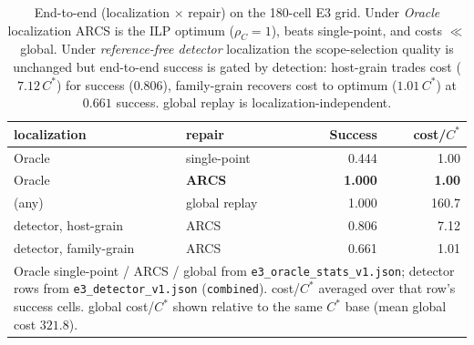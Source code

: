 \begin{table}[t]\centering\small
\caption{End-to-end (localization $\times$ repair) on the 180-cell E3 grid. Under \emph{Oracle} localization ARCS is the ILP optimum ($\rho_C\!=\!1$), beats single-point, and costs $\ll$ global. Under \emph{reference-free detector} localization the scope-selection quality is unchanged but end-to-end success is gated by detection: host-grain trades cost ($7.12\,C^*$) for success ($0.806$), family-grain recovers cost to optimum ($1.01\,C^*$) at $0.661$ success. global replay is localization-independent.}
\label{tab:joint-e2e}
\begin{tabular}{llrr}\toprule
localization & repair & Success & cost/$C^*$\\\midrule
Oracle & single-point & 0.444 & 1.00\\
Oracle & \textbf{ARCS} & \textbf{1.000} & \textbf{1.00}\\
(any) & global replay & 1.000 & 160.7\\
\midrule
detector, host-grain & ARCS & 0.806 & 7.12\\
detector, family-grain & ARCS & 0.661 & 1.01\\
\midrule
\multicolumn{4}{p{.9\linewidth}}{\footnotesize Oracle single-point / ARCS / global from \texttt{e3\_oracle\_stats\_v1.json}; detector rows from \texttt{e3\_detector\_v1.json} (\texttt{combined}). cost/$C^*$ averaged over that row's success cells. global cost/$C^*$ shown relative to the same $C^*$ base (mean global cost $321.8$).}\\
\bottomrule\end{tabular}\end{table}
